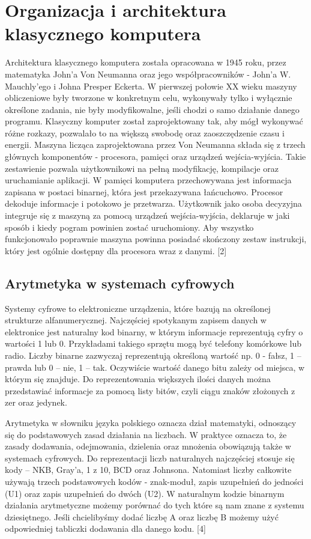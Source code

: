 \documentclass[12pt, a4paper, onside, polish]{article}				%
\begin{document}
\section{Organizacja i architektura klasycznego komputera}
\hspace{\parindent}
Architektura klasycznego komputera została opracowana w 1945 roku, przez matematyka John’a Von Neumanna oraz jego współpracowników - John’a W. Mauchly’ego i Johna Presper Eckerta. W pierwszej połowie XX wieku maszyny obliczeniowe były tworzone w konkretnym celu, wykonywały tylko i wyłącznie określone zadania, nie były modyfikowalne, jeśli chodzi o samo działanie danego programu. Klasyczny komputer został zaprojektowany tak, aby mógł wykonywać różne rozkazy, pozwalało to na większą swobodę oraz zaoszczędzenie czasu i energii. Maszyna licząca zaprojektowana przez Von Neumanna składa się z trzech głównych komponentów - procesora, pamięci oraz urządzeń wejścia-wyjścia. Takie zestawienie pozwala użytkownikowi na pełną modyfikację, kompilacje oraz uruchamianie aplikacji. W pamięci komputera przechowywana jest informacja zapisana w postaci binarnej, która jest przekazywana łańcuchowo. Procesor dekoduje informacje i potokowo je przetwarza. Użytkownik jako osoba decyzyjna integruje się z maszyną za pomocą urządzeń wejścia-wyjścia, deklaruje w jaki sposób i kiedy pogram powinien zostać uruchomiony. Aby wszystko funkcjonowało poprawnie maszyna powinna posiadać skończony zestaw instrukcji, który jest ogólnie dostępny dla procesora wraz z danymi. [2]
 
\subsection{Arytmetyka w systemach cyfrowych}
\hspace{\parindent}
Systemy cyfrowe to elektroniczne urządzenia, które bazują na określonej strukturze alfanumerycznej. Najczęściej spotykanym zapisem danych w elektronice jest naturalny kod binarny, w którym informacje reprezentują cyfry o wartości 1 lub 0.  Przykładami takiego sprzętu mogą być telefony komórkowe lub radio. Liczby binarne zazwyczaj reprezentują określoną wartość np. 0 - fałsz, 1 – prawda lub 0 – nie, 1 – tak. Oczywiście wartość danego bitu zależy od miejsca, w którym się znajduje. Do reprezentowania większych ilości danych można przedstawiać informacje za pomocą listy bitów, czyli ciągu znaków złożonych z zer oraz jedynek. 

Arytmetyka w słowniku języka polskiego oznacza dział matematyki, odnoszący się do podstawowych zasad działania na liczbach. W praktyce oznacza to, że zasady dodawania, odejmowania, dzielenia oraz mnożenia obowiązują także w systemach cyfrowych. Do reprezentacji liczb naturalnych najczęściej stosuje się kody – NKB, Gray’a, 1 z 10, BCD oraz Johnsona. Natomiast liczby całkowite używają trzech podstawowych kodów - znak-moduł, zapis uzupełnień do jedności (U1) oraz zapis uzupełnień do dwóch (U2). W naturalnym kodzie binarnym działania arytmetyczne możemy porównać do tych które są nam znane z systemu dziesiętnego. Jeśli chcielibyśmy dodać liczbę A oraz liczbę B możemy użyć odpowiedniej tabliczki dodawania dla danego kodu. [4]
\end{document}
